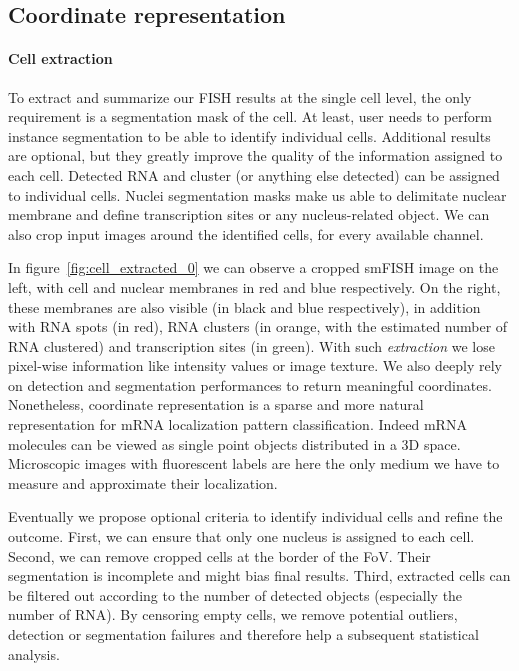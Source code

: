 \subsection{Coordinate representation} \label{subsec:coordinate_representation}

\paragraph{Cell extraction}

To extract and summarize our \ac{FISH} results at the single cell level, the only requirement is a segmentation mask of the cell.
At least, user needs to perform instance segmentation to be able to identify individual cells.
Additional results are optional, but they greatly improve the quality of the information assigned to each cell.
Detected \ac{RNA} and cluster (or anything else detected) can be assigned to individual cells.
Nuclei segmentation masks make us able to delimitate nuclear membrane and define transcription sites or any nucleus-related object.
We can also crop input images around the identified cells, for every available channel.

In figure~\ref{fig:cell_extracted_0} we can observe a cropped \ac{smFISH} image on the left, with cell and nuclear membranes in red and blue respectively.
On the right, these membranes are also visible (in black and blue respectively), in addition with \ac{RNA} spots (in red), \ac{RNA} clusters (in orange, with the estimated number of \ac{RNA} clustered) and transcription sites (in green).
With such \emph{extraction} we lose pixel-wise information like intensity values or image texture.
We also deeply rely on detection and segmentation performances to return meaningful coordinates.
Nonetheless, coordinate representation is a sparse and more natural representation for \ac{mRNA} localization pattern classification.
Indeed \ac{mRNA} molecules can be viewed as single point objects distributed in a 3D space.
Microscopic images with fluorescent labels are here the only medium we have to measure and approximate their localization.

Eventually we propose optional criteria to identify individual cells and refine the outcome.
First, we can ensure that only one nucleus is assigned to each cell.
Second, we can remove cropped cells at the border of the \ac{FoV}.
Their segmentation is incomplete and might bias final results.
Third, extracted cells can be filtered out according to the number of detected objects (especially the number of \ac{RNA}).
By censoring empty cells, we remove potential outliers, detection or segmentation failures and therefore help a subsequent statistical analysis.\\

